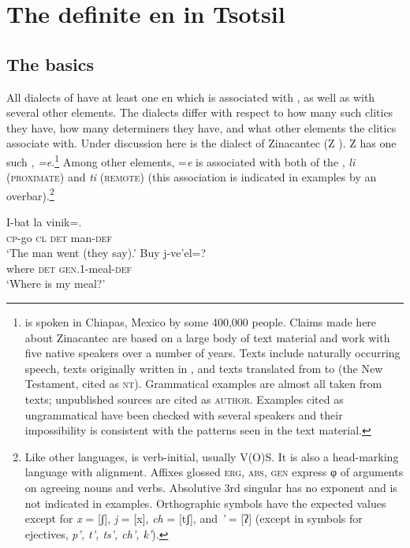 \documentclass[output=paper,
modfonts
]{LSP/langsci}
\begin{document}
\section{The definite en in Tsotsil}
\subsection{The basics}
All dialects of  have at least one en which is associated with , as well as with several other elements. 
The dialects differ with respect to how many such clitics they have, how many determiners they have, and what other elements the clitics associate with. Under discussion here is the dialect of Zinacantec  (Z ). Z  has one such , \emph{=e}.\footnote{ is spoken in Chiapas, Mexico by some 400,000 people. 
Claims made here about Zinacantec  are based on a large body of text material and work with five native speakers over a number of years. 
Texts include naturally occurring speech, texts originally written in , and texts translated from  to  (the New Testament, cited as \textsc{nt}).
Grammatical examples are almost all taken from texts; unpublished sources are cited as \textsc{author}. 
Examples cited as ungrammatical have been checked with several speakers and their impossibility is consistent with the patterns seen in the text material.}
Among other elements, =\emph{e} is associated with both of the , \emph{li} (\textsc{proximate}) and \emph{ti} (\textsc{remote}) (this association is indicated in examples by an overbar).\footnote
{Like other  languages,  is verb-initial, usually V(O)S. It is also a head-marking language with  alignment.  Affixes glossed \textsc{erg, abs, gen}
express φ  of arguments on agreeing nouns and verbs. Absolutive 3rd singular has no exponent and is not indicated in examples. 
Orthographic symbols have the expected values except for \emph{x} = [ʃ], \emph{j} = [x], \emph{ch} = [tʃ], and \emph{'} = [ʔ] (except in symbols for ejectives, \emph{p', t', ts', ch', k'}).
}
 \label{footnote:agreement}
 \begin{exe}
\ex\label{exe:exe4}
\begin{xlist}
\bridgeoverex
{}
\gll I-bat la  vinik=.\\
\textsc{cp}-go \textsc{cl} \textsc{det} man-\textsc{def} \\
\glt `The man went (they say).' \citep[28]{laughlin1977}
\bridgeoverex
{}
\gll Buy  j-ve'el=? \\
where \textsc{det} \textsc{gen.1}-meal-\textsc{def} \\
\glt `Where is my meal?' \citep[57]{laughlin1977}
\end{xlist}
\end{exe}
\end{document}
